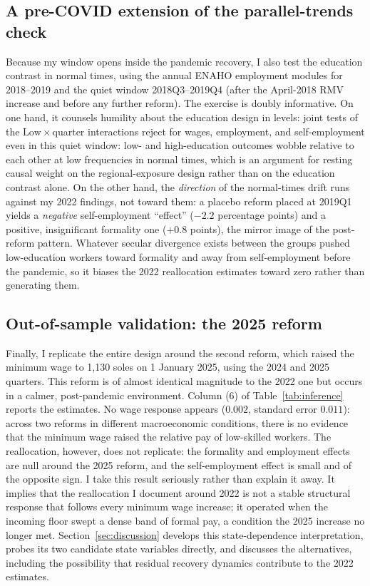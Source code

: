 \subsection{A pre-COVID extension of the parallel-trends check}

Because my window opens inside the pandemic recovery, I also test the education contrast in normal times, using the annual ENAHO employment modules for 2018--2019 and the quiet window 2018Q3--2019Q4 (after the April-2018 RMV increase and before any further reform). The exercise is doubly informative. On one hand, it counsels humility about the education design in levels: joint tests of the $\mathrm{Low}\times$quarter interactions reject for wages, employment, and self-employment even in this quiet window: low- and high-education outcomes wobble relative to each other at low frequencies in normal times, which is an argument for resting causal weight on the regional-exposure design rather than on the education contrast alone. On the other hand, the \emph{direction} of the normal-times drift runs against my 2022 findings, not toward them: a placebo reform placed at 2019Q1 yields a \emph{negative} self-employment ``effect'' ($-2.2$ percentage points) and a positive, insignificant formality one ($+0.8$ points), the mirror image of the post-reform pattern. Whatever secular divergence exists between the groups pushed low-education workers toward formality and away from self-employment before the pandemic, so it biases the 2022 reallocation estimates toward zero rather than generating them.

\subsection{Out-of-sample validation: the 2025 reform}

Finally, I replicate the entire design around the second reform, which raised the minimum wage to 1,130 soles on 1 January 2025, using the 2024 and 2025 quarters. This reform is of almost identical magnitude to the 2022 one but occurs in a calmer, post-pandemic environment. Column (6) of Table~\ref{tab:inference} reports the estimates. No wage response appears ($0.002$, standard error $0.011$): across two reforms in different macroeconomic conditions, there is no evidence that the minimum wage raised the relative pay of low-skilled workers. The reallocation, however, does not replicate: the formality and employment effects are null around the 2025 reform, and the self-employment effect is small and of the opposite sign. I take this result seriously rather than explain it away. It implies that the reallocation I document around 2022 is not a stable structural response that follows every minimum wage increase; it operated when the incoming floor swept a dense band of formal pay, a condition the 2025 increase no longer met. Section~\ref{sec:discussion} develops this state-dependence interpretation, probes its two candidate state variables directly, and discusses the alternatives, including the possibility that residual recovery dynamics contribute to the 2022 estimates.
